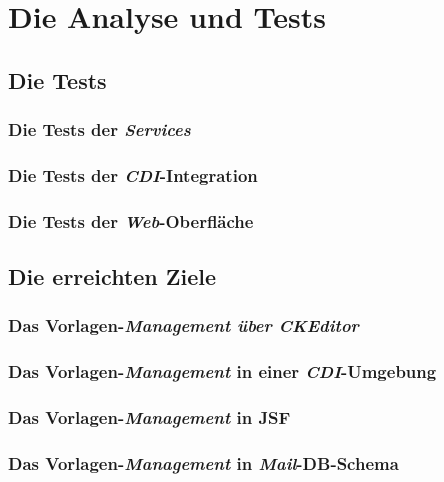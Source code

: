 \chapter{Die Analyse und Tests}
\label{cha:Analyse}
\section{Die Tests}

\subsection{Die Tests der \emph{Services}}

\subsection{Die Tests der \emph{CDI}-Integration}

\subsection{Die Tests der \emph{Web}-Oberfläche}


\section{Die erreichten Ziele}

\subsection{Das Vorlagen-\emph{Management über \emph{CKEditor}}}

\subsection{Das Vorlagen-\emph{Management} in einer \emph{CDI}-Umgebung}

\subsection{Das Vorlagen-\emph{Management} in JSF}
\subsection{Das Vorlagen-\emph{Management} in \emph{Mail}-DB-Schema}


